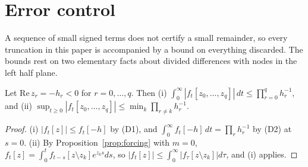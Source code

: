 \section{Error control}\label{sec:error}

A sequence of small signed terms does not certify a small remainder, so every truncation in this paper is accompanied by a bound on everything discarded. The bounds rest on two elementary facts about divided differences with nodes in the left half plane.

\begin{lemma}\label{lem:dd}
Let $\mathrm{Re}\,z_r=-h_r<0$ for $r=0,\dots,q$. Then
(i) $\int_0^\infty|f_t[z_0,\dots,z_q]|\,dt\le\prod_{r=0}^q h_r^{-1}$, and
(ii) $\sup_{t\ge0}|f_t[z_0,\dots,z_q]|\le\min_k\prod_{r\neq k}h_r^{-1}$.
\end{lemma}
\begin{proof}
(i) $|f_t[z]|\le f_t[-h]$ by (D1), and $\int_0^\infty f_t[-h]\,dt=\prod_r h_r^{-1}$ by (D2) at $s=0$. (ii) By Proposition~\ref{prop:forcing} with $m=0$, $f_t[z]=\int_0^tf_{t-s}[z\setminus z_k]e^{z_ks}ds$, so $|f_t[z]|\le\int_0^\infty|f_\tau[z\setminus z_k]|d\tau$, and (i) applies.
\end{proof}

